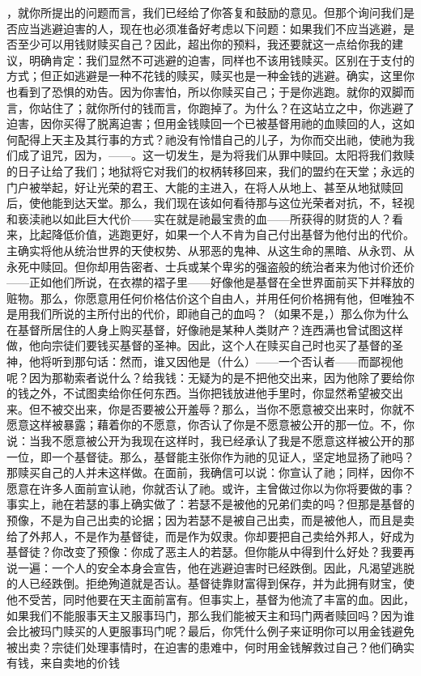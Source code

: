 ，就你所提出的问题而言，我们已经给了你答复和鼓励的意见。但那个询问我们是否应当逃避迫害的人，现在也必须准备好考虑以下问题：如果我们不应当逃避，是否至少可以用钱财赎买自己？因此，超出你的预料，我还要就这一点给你我的建议，明确肯定：我们显然不可逃避的迫害，同样也不该用钱赎买。区别在于支付的方式；但正如逃避是一种不花钱的赎买，赎买也是一种金钱的逃避。确实，这里你也看到了恐惧的劝告。因为你害怕，所以你赎买自己；于是你逃跑。就你的双脚而言，你站住了；就你所付的钱而言，你跑掉了。为什么？在这站立之中，你逃避了迫害，因你买得了脱离迫害；但用金钱赎回一个已被基督用祂的血赎回的人，这如何配得上天主及其行事的方式？祂没有怜惜自己的儿子，为你而交出祂，使祂为我们成了诅咒，因为，——。这一切发生，是为将我们从罪中赎回。太阳将我们救赎的日子让给了我们；地狱将它对我们的权柄转移回来，我们的盟约在天堂；永远的门户被举起，好让光荣的君王、大能的主进入，在将人从地上、甚至从地狱赎回后，使他能到达天堂。那么，我们现在该如何看待那与这位光荣者对抗，不，轻视和亵渎祂以如此巨大代价——实在就是祂最宝贵的血——所获得的财货的人？看来，比起降低价值，逃跑更好，如果一个人不肯为自己付出基督为他付出的代价。主确实将他从统治世界的天使权势、从邪恶的鬼神、从这生命的黑暗、从永罚、从永死中赎回。但你却用告密者、士兵或某个卑劣的强盗般的统治者来为他讨价还价——正如他们所说，在衣襟的褶子里——好像他是基督在全世界面前买下并释放的赃物。那么，你愿意用任何价格估价这个自由人，并用任何价格拥有他，但唯独不是用我们所说的主所付出的代价，即祂自己的血吗？（如果不是，）那么你为什么在基督所居住的人身上购买基督，好像祂是某种人类财产？连西满也曾试图这样做，他向宗徒们要钱买基督的圣神。因此，这个人在赎买自己时也买了基督的圣神，他将听到那句话：然而，谁又因他是（什么）——一个否认者——而鄙视他呢？因为那勒索者说什么？给我钱：无疑为的是不把他交出来，因为他除了要给你的钱之外，不试图卖给你任何东西。当你把钱放进他手里时，你显然希望被交出来。但不被交出来，你是否要被公开羞辱？那么，当你不愿意被交出来时，你就不愿意这样被暴露；藉着你的不愿意，你否认了你是不愿意被公开的那一位。不，你说：当我不愿意被公开为我现在这样时，我已经承认了我是不愿意这样被公开的那一位，即一个基督徒。那么，基督能主张你作为祂的见证人，坚定地显扬了祂吗？那赎买自己的人并未这样做。在面前，我确信可以说：你宣认了祂；同样，因你不愿意在许多人面前宣认祂，你就否认了祂。或许，主曾做过你以为你将要做的事？事实上，祂在若瑟的事上确实做了：若瑟不是被他的兄弟们卖的吗？但那是基督的预像，不是为自己出卖的论据；因为若瑟不是被自己出卖，而是被他人，而且是卖给了外邦人，不是作为基督徒，而是作为奴隶。你却要把自己卖给外邦人，好成为基督徒？你改变了预像：你成了恶主人的若瑟。但你能从中得到什么好处？我要再说一遍：一个人的安全本身会宣告，他在逃避迫害时已经跌倒。因此，凡渴望逃脱的人已经跌倒。拒绝殉道就是否认。基督徒靠财富得到保存，并为此拥有财宝，使他不受苦，同时他要在天主面前富有。但事实上，基督为他流了丰富的血。因此，如果我们不能服事天主又服事玛门，那么我们能被天主和玛门两者赎回吗？因为谁会比被玛门赎买的人更服事玛门呢？最后，你凭什么例子来证明你可以用金钱避免被出卖？宗徒们处理事情时，在迫害的患难中，何时用金钱解救过自己？他们确实有钱，来自卖地的价钱